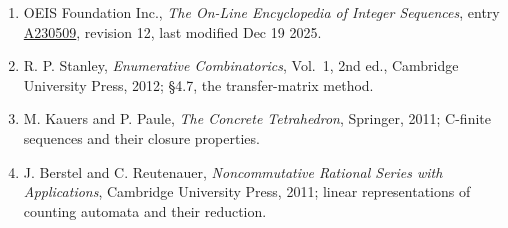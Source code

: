 \documentclass[11pt]{article}
\theoremstyle{definition}
\begin{document}
\begin{enumerate}

\item OEIS Foundation Inc., \emph{The On-Line Encyclopedia of Integer Sequences}, entry \href{https://oeis.org/A230509}{A230509}, revision 12, last modified Dec 19 2025.

\item R. P. Stanley, \emph{Enumerative Combinatorics}, Vol.~1, 2nd ed., Cambridge University Press, 2012; \S4.7, the transfer-matrix method.

\item M. Kauers and P. Paule, \emph{The Concrete Tetrahedron}, Springer, 2011; C-finite sequences and their closure properties.

\item J. Berstel and C. Reutenauer, \emph{Noncommutative Rational Series with Applications}, Cambridge University Press, 2011; linear representations of counting automata and their reduction.

\end{enumerate}
\end{document}
